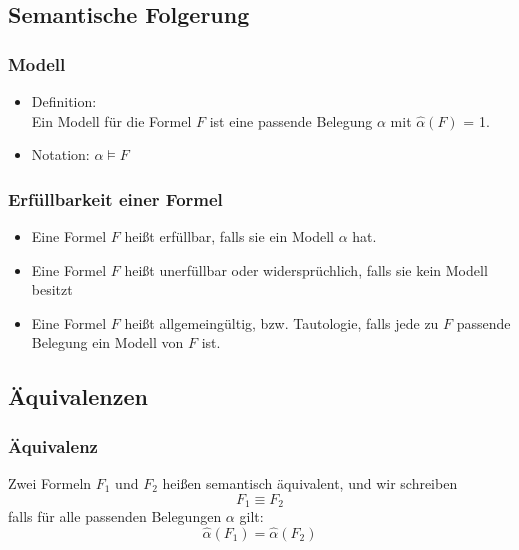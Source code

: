 \documentclass{scrartcl}
\begin{document}
\subsection{Semantische Folgerung}

\subsubsection{Modell}

\begin{itemize}
	\item Definition: \\
	Ein Modell für die Formel $F$ ist eine passende Belegung $\alpha$ mit $\widehat{\alpha}(F)$ = 1.
	\item Notation: $\alpha \models F$
\end{itemize}

\subsubsection{Erfüllbarkeit einer Formel}

\begin{itemize}
	\item Eine Formel $F$ heißt erfüllbar, falls sie ein Modell $\alpha$ hat.
	\item Eine Formel $F$ heißt unerfüllbar oder widersprüchlich, falls sie kein Modell besitzt
	\item Eine Formel $F$ heißt allgemeingültig, bzw. Tautologie, falls jede zu $F$ passende Belegung ein Modell von $F$ ist.
\end{itemize}

\pagebreak
\subsection{Äquivalenzen}

\subsubsection{Äquivalenz}

Zwei Formeln $F_1$ und $F_2$ heißen semantisch äquivalent, und wir schreiben
\begin{equation}
	F_1 \equiv F_2
\end{equation}
falls für alle passenden Belegungen $\alpha$ gilt:
\begin{equation}
	\widehat{\alpha}(F_1) = \widehat{\alpha}(F_2)
\end{equation}
\end{document}
